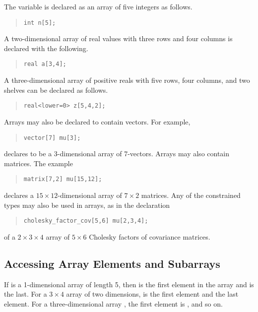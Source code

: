 The variable  is declared as an array of five integers as follows.
%
\begin{quote}
\begin{Verbatim}  
int n[5];
\end{Verbatim}
\end{quote}
% 
A two-dimensional array of real values with three rows and four columns is
declared with the following.
%
\begin{quote}
\begin{Verbatim}  
real a[3,4];
\end{Verbatim}
\end{quote}
% 
A three-dimensional array  of positive reals with five rows, four
columns, and two shelves can be declared as follows.
%
\begin{quote}
\begin{Verbatim} 
real<lower=0> z[5,4,2];
\end{Verbatim}
\end{quote}
%

Arrays may also be declared to contain vectors.  For example,
%
\begin{quote}
\begin{Verbatim}  
vector[7] mu[3];
\end{Verbatim}
\end{quote}
% 
declares  to be a 3-dimensional array of 7-vectors.  
Arrays may also contain matrices.  The example
%
\begin{quote}
\begin{Verbatim} 
matrix[7,2] mu[15,12];
\end{Verbatim}
\end{quote}
%
declares a $15 \times 12$-dimensional array of $7 \times 2$ matrices.
Any of the constrained types may also be used in arrays, as in the
declaration
%
\begin{quote}
\begin{Verbatim}  
cholesky_factor_cov[5,6] mu[2,3,4];
\end{Verbatim}
\end{quote}
% 
of a $2 \times 3 \times 4$ array of $5 \times 6$ Cholesky factors of
covariance matrices.

\subsection{Accessing Array Elements and Subarrays}

If  is a 1-dimensional array of length 5, then  is
the first element in the array and  is the last.  For a $3
\times 4$ array  of two dimensions,  is the first
element and  the last element.  For a three-dimensional
array , the first element is , and so on.

